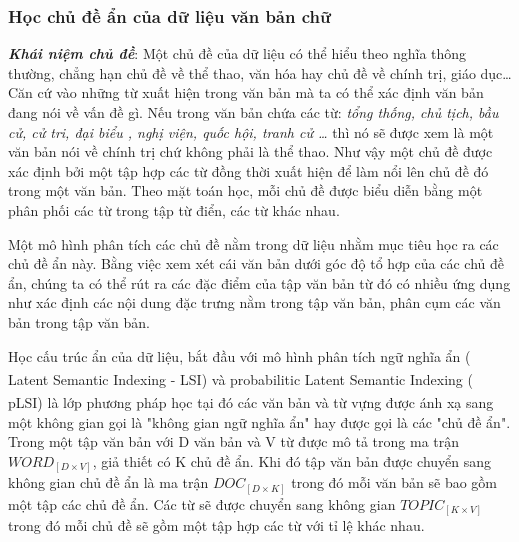 \documentclass[fontsize=13pt]{scrartcl}
\begin{document}
\subsubsection{Học chủ đề ẩn của dữ liệu văn bản chữ}
\textbf{\textit{Khái niệm chủ đề}}: Một chủ đề của dữ liệu có thể hiểu theo nghĩa thông thường, chẳng hạn chủ đề về thể thao, văn hóa hay chủ đề về chính trị, giáo dục…Căn cứ vào những từ xuất hiện trong văn bản mà ta có thể xác định văn bản đang nói về vấn đề gì. Nếu trong văn bản chứa các từ: \textit{ tổng thống, chủ tịch, bầu cử, cử tri, đại biểu , nghị viện,  quốc hội, tranh cử \ldots} thì nó sẽ được xem là một văn bản nói về chính trị chứ không phải là thể thao. Như vậy một chủ đề được xác định bởi một tập hợp các từ đồng thời xuất hiện để làm nổi lên chủ đề đó trong một văn bản. Theo mặt toán học, mỗi chủ đề được biểu diễn bằng một phân phối các từ trong tập từ điển, các từ khác nhau. 
\par 
Một mô hình phân tích các chủ đề nằm trong dữ liệu nhằm mục tiêu học ra các chủ đề ẩn này.  Bằng việc xem xét cái văn bản dưới góc độ tổ hợp của các chủ đề ẩn, chúng ta có thể rút ra các đặc điểm của tập văn bản từ đó có nhiều ứng dụng như xác định các nội dung đặc trưng nằm trong tập văn bản, phân cụm các văn bản trong tập văn bản.
\par 
Học cấu trúc ẩn của dữ liệu, bắt đầu với mô hình phân tích ngữ nghĩa ẩn ( Latent Semantic Indexing - LSI) \textsuperscript{\cite{LSI}} và probabilitic Latent Semantic Indexing ( pLSI)\textsuperscript{\cite{plsi}} là lớp phương pháp học tại đó các văn bản và từ vựng được ánh xạ sang một không gian gọi là "không gian ngữ nghĩa ẩn"  hay được gọi là các "chủ đề ẩn". Trong một tập văn bản với D văn bản và V từ được mô tả trong ma trận $WORD_{[D\times V]}$, giả thiết có K chủ đề ẩn. Khi đó tập văn bản được chuyển sang không gian chủ đề ẩn là ma trận $DOC_{[D\times K]}$ trong đó mỗi văn bản sẽ bao gồm một tập các chủ đề ẩn. Các từ sẽ được chuyển sang không gian $TOPIC_{[K\times V]}$ trong đó mỗi chủ đề sẽ gồm một tập hợp các từ với tỉ lệ khác nhau.
\par
\end{document}

